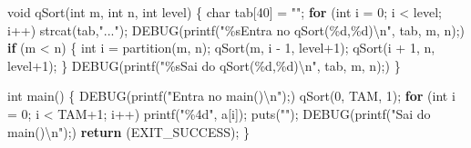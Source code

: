 \documentclass[
  brazilian,
  letterpaper,
]{book}
\newenvironment{Shaded}{\begin{snugshade}}{\end{snugshade}}
\newcommand{\ControlFlowTok}[1]{\textcolor[rgb]{0.00,0.23,0.31}{\textbf{#1}}}
\newcommand{\DataTypeTok}[1]{\textcolor[rgb]{0.68,0.00,0.00}{#1}}
\newcommand{\DecValTok}[1]{\textcolor[rgb]{0.68,0.00,0.00}{#1}}
\newcommand{\NormalTok}[1]{\textcolor[rgb]{0.00,0.23,0.31}{#1}}
\newcommand{\OperatorTok}[1]{\textcolor[rgb]{0.37,0.37,0.37}{#1}}
\newcommand{\SpecialCharTok}[1]{\textcolor[rgb]{0.37,0.37,0.37}{#1}}
\newcommand{\StringTok}[1]{\textcolor[rgb]{0.13,0.47,0.30}{#1}}
\theoremstyle{plain}
\theoremstyle{definition}
\theoremstyle{remark}
\begin{document}
\begin{Shaded}
\begin{Highlighting}[]
\DataTypeTok{void}\NormalTok{ qSort}\OperatorTok{(}\DataTypeTok{int}\NormalTok{ m}\OperatorTok{,} \DataTypeTok{int}\NormalTok{ n}\OperatorTok{,} \DataTypeTok{int}\NormalTok{ level}\OperatorTok{)}
\OperatorTok{\{}
    \DataTypeTok{char}\NormalTok{ tab}\OperatorTok{[}\DecValTok{40}\OperatorTok{]} \OperatorTok{=} \StringTok{""}\OperatorTok{;}
    \ControlFlowTok{for} \OperatorTok{(}\DataTypeTok{int}\NormalTok{ i }\OperatorTok{=} \DecValTok{0}\OperatorTok{;}\NormalTok{ i }\OperatorTok{\textless{}}\NormalTok{ level}\OperatorTok{;}\NormalTok{ i}\OperatorTok{++)}
\NormalTok{       strcat}\OperatorTok{(}\NormalTok{tab}\OperatorTok{,}\StringTok{"..."}\OperatorTok{);}
\NormalTok{    DEBUG}\OperatorTok{(}\NormalTok{printf}\OperatorTok{(}\StringTok{"}\SpecialCharTok{\%s}\StringTok{Entra no qSort(}\SpecialCharTok{\%d}\StringTok{,}\SpecialCharTok{\%d}\StringTok{)}\SpecialCharTok{\textbackslash{}n}\StringTok{"}\OperatorTok{,}\NormalTok{ tab}\OperatorTok{,}\NormalTok{ m}\OperatorTok{,}\NormalTok{ n}\OperatorTok{);)}
    \ControlFlowTok{if} \OperatorTok{(}\NormalTok{m }\OperatorTok{\textless{}}\NormalTok{ n}\OperatorTok{)}
    \OperatorTok{\{}
        \DataTypeTok{int}\NormalTok{ i }\OperatorTok{=}\NormalTok{ partition}\OperatorTok{(}\NormalTok{m}\OperatorTok{,}\NormalTok{ n}\OperatorTok{);}
\NormalTok{        qSort}\OperatorTok{(}\NormalTok{m}\OperatorTok{,}\NormalTok{ i }\OperatorTok{{-}} \DecValTok{1}\OperatorTok{,}\NormalTok{ level}\OperatorTok{+}\DecValTok{1}\OperatorTok{);}
\NormalTok{        qSort}\OperatorTok{(}\NormalTok{i }\OperatorTok{+} \DecValTok{1}\OperatorTok{,}\NormalTok{ n}\OperatorTok{,}\NormalTok{ level}\OperatorTok{+}\DecValTok{1}\OperatorTok{);}
    \OperatorTok{\}}
\NormalTok{    DEBUG}\OperatorTok{(}\NormalTok{printf}\OperatorTok{(}\StringTok{"}\SpecialCharTok{\%s}\StringTok{Sai do qSort(}\SpecialCharTok{\%d}\StringTok{,}\SpecialCharTok{\%d}\StringTok{)}\SpecialCharTok{\textbackslash{}n}\StringTok{"}\OperatorTok{,}\NormalTok{ tab}\OperatorTok{,}\NormalTok{ m}\OperatorTok{,}\NormalTok{ n}\OperatorTok{);)}
\OperatorTok{\}}

\DataTypeTok{int}\NormalTok{ main}\OperatorTok{()}
\OperatorTok{\{}
\NormalTok{    DEBUG}\OperatorTok{(}\NormalTok{printf}\OperatorTok{(}\StringTok{"Entra no main()}\SpecialCharTok{\textbackslash{}n}\StringTok{"}\OperatorTok{);)}
\NormalTok{    qSort}\OperatorTok{(}\DecValTok{0}\OperatorTok{,}\NormalTok{ TAM}\OperatorTok{,} \DecValTok{1}\OperatorTok{);}
    \ControlFlowTok{for} \OperatorTok{(}\DataTypeTok{int}\NormalTok{ i }\OperatorTok{=} \DecValTok{0}\OperatorTok{;}\NormalTok{ i }\OperatorTok{\textless{}}\NormalTok{ TAM}\OperatorTok{+}\DecValTok{1}\OperatorTok{;}\NormalTok{ i}\OperatorTok{++)}
\NormalTok{      printf}\OperatorTok{(}\StringTok{"}\SpecialCharTok{\%4d}\StringTok{"}\OperatorTok{,}\NormalTok{ a}\OperatorTok{[}\NormalTok{i}\OperatorTok{]);}
\NormalTok{    puts}\OperatorTok{(}\StringTok{""}\OperatorTok{);}
\NormalTok{    DEBUG}\OperatorTok{(}\NormalTok{printf}\OperatorTok{(}\StringTok{"Sai do main()}\SpecialCharTok{\textbackslash{}n}\StringTok{"}\OperatorTok{);)}
    \ControlFlowTok{return} \OperatorTok{(}\NormalTok{EXIT\_SUCCESS}\OperatorTok{);}
\OperatorTok{\}}
\end{Highlighting}
\end{Shaded}
\end{document}
